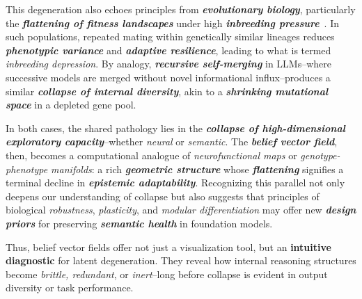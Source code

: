 \vspace{0.5em}
\noindent This degeneration also echoes principles from \textbf{\emph{evolutionary biology}}, particularly the \textbf{\emph{flattening of fitness landscapes}} under high \textbf{\emph{inbreeding pressure}}~\citep{charlesworth1999inbreeding}. In such populations, repeated mating within genetically similar lineages reduces \textbf{\emph{phenotypic variance}} and \textbf{\emph{adaptive resilience}}, leading to what is termed \emph{inbreeding depression}. By analogy, \textbf{\emph{recursive self-merging}} in LLMs--where successive models are merged without novel informational influx--produces a similar \textbf{\emph{collapse of internal diversity}}, akin to a \textbf{\emph{shrinking mutational space}} in a depleted gene pool.

\vspace{0.5em}
\noindent In both cases, the shared pathology lies in the \textbf{\emph{collapse of high-dimensional exploratory capacity}}--whether \emph{neural} or \emph{semantic}. The \textbf{\emph{belief vector field}}, then, becomes a computational analogue of \emph{neurofunctional maps} or \emph{genotype-phenotype manifolds}: a rich \textbf{\emph{geometric structure}} whose \textbf{\emph{flattening}} signifies a terminal decline in \textbf{\emph{epistemic adaptability}}. Recognizing this parallel not only deepens our understanding of collapse but also suggests that principles of biological \emph{robustness}, \emph{plasticity}, and \emph{modular differentiation} may offer new \textbf{\emph{design priors}} for preserving \textbf{\emph{semantic health}} in foundation models.



\vspace{0.5em}
\noindent Thus, belief vector fields offer not just a visualization tool, but an \textbf{intuitive diagnostic} for latent degeneration. They reveal how internal reasoning structures become \emph{brittle, redundant}, or \emph{inert}--long before collapse is evident in output diversity or task performance.




